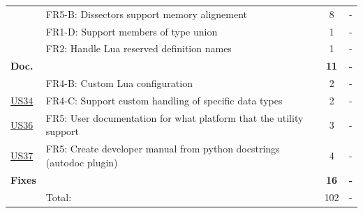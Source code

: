\begin{table}[!htb]
\begin{tabularx}{\textwidth}{l X c c}
	 & FR5-B: Dissectors support memory alignement & 8 & - \\
	 & FR1-D: Support members of type union & 1 & - \\
	 & FR2: Handle Lua reserved definition names & 1 & - \\
	\addlinespace
	\textbf{Doc.} &  & \textbf{11} & \textbf{-} \\
	 & FR4-B: Custom Lua configuration & 2 & - \\
	\hyperref[tab:req:stories8]{US34} & FR4-C: Support custom handling of specific data types & 2 & - \\
	\hyperref[tab:req:stories9]{US36} & FR5: User documentation for what platform that the utility support & 3 & - \\
	\hyperref[tab:req:stories9]{US37} & FR5: Create developer manual from python docstrings (autodoc plugin) & 4 & - \\
	\addlinespace
	\textbf{Fixes} &  & \textbf{16} & \textbf{-} \\
	\midrule
	& Total: & 102 &  -\\
	\bottomrule
\end{tabularx}
\end{table}


